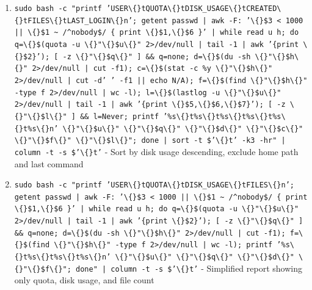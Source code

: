 \documentclass[openany]{book}
\begin{document}
\begin{enumerate}
  \item \texttt{sudo bash -c "printf 'USER\textbackslash\{\}tQUOTA\textbackslash\{\}tDISK\_USAGE\textbackslash\{\}tCREATED\textbackslash\{\}tFILES\textbackslash\{\}tLAST\_LOGIN\textbackslash\{\}n'; getent passwd | awk -F: '\textbackslash\{\}\$3 < 1000 || \textbackslash\{\}\$1 \textasciitilde{} /\textasciicircum{}nobody\$/ \{ print \textbackslash\{\}\$1,\textbackslash\{\}\$6 \}' | while read u h; do q=\textbackslash\{\}\$(quota -u \textbackslash\{\}"\textbackslash\{\}\$u\textbackslash\{\}" 2>/dev/null | tail -1 | awk '\{print \textbackslash\{\}\$2\}'); [ -z \textbackslash\{\}"\textbackslash\{\}\$q\textbackslash\{\}" ] \&\& q=none; d=\textbackslash\{\}\$(du -sh \textbackslash\{\}"\textbackslash\{\}\$h\textbackslash\{\}" 2>/dev/null | cut -f1); c=\textbackslash\{\}\$(stat -c \%y \textbackslash\{\}"\textbackslash\{\}\$h\textbackslash\{\}" 2>/dev/null | cut -d' ' -f1 || echo N/A); f=\textbackslash\{\}\$(find \textbackslash\{\}"\textbackslash\{\}\$h\textbackslash\{\}" -type f 2>/dev/null | wc -l); l=\textbackslash\{\}\$(lastlog -u \textbackslash\{\}"\textbackslash\{\}\$u\textbackslash\{\}" 2>/dev/null | tail -1 | awk '\{print \textbackslash\{\}\$5,\textbackslash\{\}\$6,\textbackslash\{\}\$7\}'); [ -z \textbackslash\{\}"\textbackslash\{\}\$l\textbackslash\{\}" ] \&\& l=Never; printf '\%s\textbackslash\{\}t\%s\textbackslash\{\}t\%s\textbackslash\{\}t\%s\textbackslash\{\}t\%s\textbackslash\{\}t\%s\textbackslash\{\}n' \textbackslash\{\}"\textbackslash\{\}\$u\textbackslash\{\}" \textbackslash\{\}"\textbackslash\{\}\$q\textbackslash\{\}" \textbackslash\{\}"\textbackslash\{\}\$d\textbackslash\{\}" \textbackslash\{\}"\textbackslash\{\}\$c\textbackslash\{\}" \textbackslash\{\}"\textbackslash\{\}\$f\textbackslash\{\}" \textbackslash\{\}"\textbackslash\{\}\$l\textbackslash\{\}"; done | sort -t \$'\textbackslash\{\}t' -k3 -hr" | column -t -s \$'\textbackslash\{\}t'} - Sort by disk usage descending, exclude home path and last command
  \item \texttt{sudo bash -c "printf 'USER\textbackslash\{\}tQUOTA\textbackslash\{\}tDISK\_USAGE\textbackslash\{\}tFILES\textbackslash\{\}n'; getent passwd | awk -F: '\textbackslash\{\}\$3 < 1000 || \textbackslash\{\}\$1 \textasciitilde{} /\textasciicircum{}nobody\$/ \{ print \textbackslash\{\}\$1,\textbackslash\{\}\$6 \}' | while read u h; do q=\textbackslash\{\}\$(quota -u \textbackslash\{\}"\textbackslash\{\}\$u\textbackslash\{\}" 2>/dev/null | tail -1 | awk '\{print \textbackslash\{\}\$2\}'); [ -z \textbackslash\{\}"\textbackslash\{\}\$q\textbackslash\{\}" ] \&\& q=none; d=\textbackslash\{\}\$(du -sh \textbackslash\{\}"\textbackslash\{\}\$h\textbackslash\{\}" 2>/dev/null | cut -f1); f=\textbackslash\{\}\$(find \textbackslash\{\}"\textbackslash\{\}\$h\textbackslash\{\}" -type f 2>/dev/null | wc -l); printf '\%s\textbackslash\{\}t\%s\textbackslash\{\}t\%s\textbackslash\{\}t\%s\textbackslash\{\}n' \textbackslash\{\}"\textbackslash\{\}\$u\textbackslash\{\}" \textbackslash\{\}"\textbackslash\{\}\$q\textbackslash\{\}" \textbackslash\{\}"\textbackslash\{\}\$d\textbackslash\{\}" \textbackslash\{\}"\textbackslash\{\}\$f\textbackslash\{\}"; done" | column -t -s \$'\textbackslash\{\}t'} - Simplified report showing only quota, disk usage, and file count

\end{enumerate}
\end{document}
